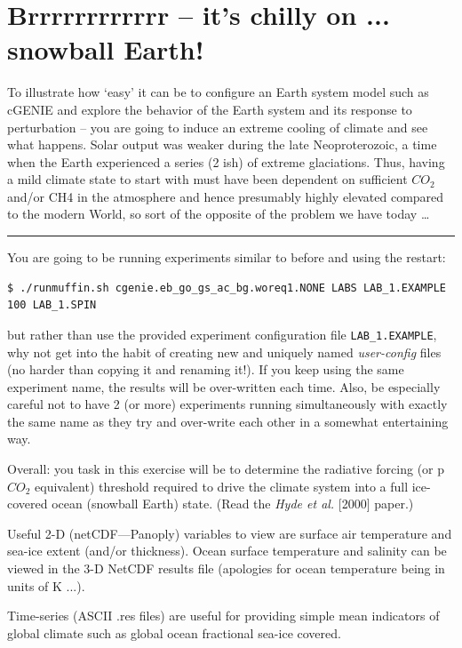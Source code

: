 \documentclass[11pt,fleqn]{book} %
\begin{document}

\section{Brrrrrrrrrrrr – it’s chilly on ... snowball Earth!}

To illustrate how ‘easy’ it can be to configure an Earth system model such as cGENIE and explore the behavior of the Earth system and its response to perturbation – you are going to induce an extreme cooling of climate and see what happens. Solar output was weaker during the late Neoproterozoic, a time when the Earth experienced a series (2 ish) of extreme glaciations. Thus, having a mild climate state to start with must have been dependent on sufficient \(CO_{2}\) and/or CH4 in the atmosphere and hence presumably highly elevated compared to the modern World, so sort of the opposite of the problem we have today …

\hfill \break
\noindent\rule{4cm}{0.1mm}
\hfill \break

You are going to be running experiments similar to before and using the restart: 
\footnotesize\begin{verbatim}
$ ./runmuffin.sh cgenie.eb_go_gs_ac_bg.woreq1.NONE LABS LAB_1.EXAMPLE 100 LAB_1.SPIN 
\end{verbatim}\normalsize
  
but rather than use the provided experiment configuration file \texttt{LAB\_1.EXAMPLE}, why not get into the habit of creating new and uniquely named \textit{user-config} files (no harder than copying it and renaming it!). If you keep using the same experiment name, the results will be over-written each time. Also, be especially careful not to have 2 (or more) experiments running simultaneously with exactly the same name as they try and over-write each other in a somewhat entertaining way.

Overall: you task in this exercise will be to determine the radiative forcing (or p\(CO_{2}\) equivalent) threshold required to drive the climate system into a full ice-covered ocean (snowball Earth) state. (Read the \textit{Hyde et al.} [2000] paper.)

Useful 2-D (netCDF—Panoply) variables to view are surface air temperature and sea-ice extent (and/or thickness). Ocean surface temperature and salinity can be viewed in the 3-D NetCDF results file (apologies for ocean temperature being in units of K ...).

Time-series (ASCII .res files) are useful for providing simple mean indicators of global climate such as global ocean fractional sea-ice covered. 
\end{document}
